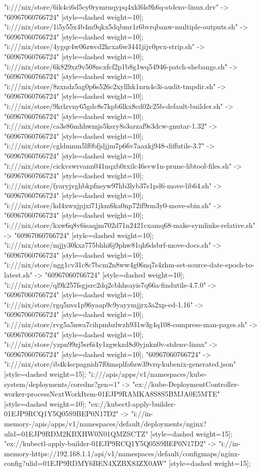 {"i:///nix/store/6ik4ci6d5cy0rymrnqypq4xkl6ls9h6q-stdenv-linux.drv" -> "60967060766724" [style=dashed weight=10];
"i:///nix/store/1i5y55x4b4m9qkx5dqbmr1r6bvrqbanw-multiple-outputs.sh" -> "60967060766724" [style=dashed weight=10];
"i:///nix/store/4ygqr4w06zwcd2kcxa6w3441jijv0pvx-strip.sh" -> "60967060766724" [style=dashed weight=10];
"i:///nix/store/6k829xz9v508ncxfcf2p1b8g1wq54946-patch-shebangs.sh" -> "60967060766724" [style=dashed weight=10];
"i:///nix/store/8zxndz5ag0p6s526c2xyllhk1nrn4c3i-audit-tmpdir.sh" -> "60967060766724" [style=dashed weight=10];
"i:///nix/store/9krlzvny65gdc8s7kpb6lkx8cd02c25b-default-builder.sh" -> "60967060766724" [style=dashed weight=10];
"i:///nix/store/ca3s86mhhwmjs5ksry8s3arzaf9s3dcw-gnutar-1.32" -> "60967060766724" [style=dashed weight=10];
"i:///nix/store/cgldmnm5lf0bfjdjjm7p66v7aaxkj948-diffutils-3.7" -> "60967060766724" [style=dashed weight=10];
"i:///nix/store/cickvswrvann041nqxb0rxilc46svw1n-prune-libtool-files.sh" -> "60967060766724" [style=dashed weight=10];
"i:///nix/store/fyaryjvghbkpfnsyw97hb3lyb37s1pd6-move-lib64.sh" -> "60967060766724" [style=dashed weight=10];
"i:///nix/store/kd4xwxjpjxi71jkm6ka0np72if9rm3y0-move-sbin.sh" -> "60967060766724" [style=dashed weight=10];
"i:///nix/store/kxw6q8v6isaqjm702d71n2421cxamq68-make-symlinks-relative.sh" -> "60967060766724" [style=dashed weight=10];
"i:///nix/store/mjjy30kxz775bhhi6j9phw81qh6dsbrf-move-docs.sh" -> "60967060766724" [style=dashed weight=10];
"i:///nix/store/ngg1cv31c8c7bcm2n8ww4g06nq7s4zhm-set-source-date-epoch-to-latest.sh" -> "60967060766724" [style=dashed weight=10];
"i:///nix/store/ql9k257fsgjsrc2dq2cbhhsayis7q66a-findutils-4.7.0" -> "60967060766724" [style=dashed weight=10];
"i:///nix/store/rgq5nvs1p96yaap9c9yayymjjrx3a2xp-ed-1.16" -> "60967060766724" [style=dashed weight=10];
"i:///nix/store/rvg5a5nwa7cihpmbzlwzh931w3g4q108-compress-man-pages.sh" -> "60967060766724" [style=dashed weight=10];
"i:///nix/store/yzpn99zj5sr6i4y1zgwkzd8d0yjnkn0v-stdenv-linux" -> "60967060766724" [style=dashed weight=10];
"60967060766724" -> "i:///nix/store/ib4k4scpagnidi7f0imsplfa6zw39vrq-kubenix-generated.json" [style=dashed weight=15];
"i:///apis/apps/v1/namespaces/kube-system/deployments/coredns?gen=1" -> "ex://kube-DeploymentController-worker-processNextWorkItem-01EJP9RAMKA8S8S5BMJA0E5MTE" [style=dashed weight=10];
"ex://kubectl-apply-builder-01EJP9RCQ1Y5Q05S9BEP0N17D2" -> "i://in-memory-/apis/apps/v1/namespaces/default/deployments/nginx?ulid=01EJP9RDM2KBXHW0N01QMZSCTZ" [style=dashed weight=15];
"ex://kubectl-apply-builder-01EJP9RCQ1Y5Q05S9BEP0N17D2" -> "i://in-memory-https://192.168.1.1/api/v1/namespaces/default/configmaps/nginx-config?ulid=01EJP9RDMY6BEN4XZBX83ZX0AW" [style=dashed weight=15];
}

